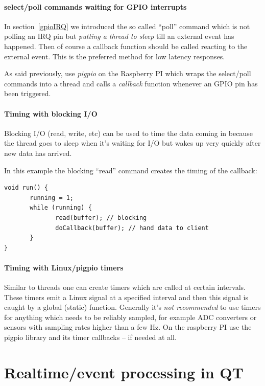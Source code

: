 \documentclass[12pt]{report}
\begin{document}
\subsubsection{select/poll commands waiting for GPIO interrupts}
In section~\ref{gpioIRQ} we introduced the so called ``poll'' command
which is not polling an IRQ pin but \textsl{putting a thread to sleep} till an
external event has happened. Then of course a callback function should
be called reacting to the external event. This is the preferred method
for low latency responses.

As said previously, use \textsl{pigpio} on the Raspberry PI
which wraps the select/poll commands into a thread and calls a
\textsl{callback} function whenever an GPIO pin has been triggered.


\subsubsection{Timing with blocking I/O}
Blocking I/O (read, write, etc) can be used to time
the data coming in because the thread goes to sleep when it's waiting for
I/O but wakes up very quickly after new data has arrived.

In this example the blocking ``read'' command creates
the timing of the callback:
\begin{verbatim}
void run() {
       running = 1;
       while (running) {
              read(buffer); // blocking
              doCallback(buffer); // hand data to client
       }
}
\end{verbatim}


\subsubsection{Timing with Linux/pigpio timers}
Similar to threads one can create timers which are called at certain
intervals. These timers emit a Linux signal at a specified interval
and then this signal is caught by a global (static) function.
Generally it's \textsl{not recommended} to use timers for anything
which needs to be reliably sampled, for example ADC converters or
sensors with sampling rates higher than a few Hz. On the raspberry PI
use the pigpio library and its timer callbacks -- if needed at all.



\chapter{Realtime/event processing in QT}
\end{document}
